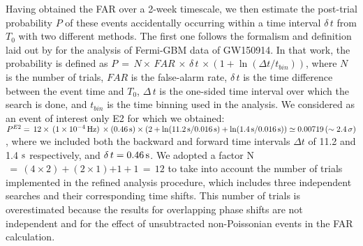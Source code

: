 \documentclass[preprint2]{aastex}
\def \fvv {}
\def \fvvv {}
\def \fvr {}
\begin{document}
Having obtained the FAR over a 2-week timescale, we then estimate the post-trial probability $P$ of these events accidentally occurring within a time interval
$\delta \, t$ from $T_0$ {\fvv with two different methods. The first one follows} the formalism and definition laid out by \cite{2016ApJ...826L...6C} for the analysis of Fermi-GBM data of GW150914.
%
{\fvv In that work, t}he probability {\fvv is defined as}
$P\,= \, N \times\, FAR \,\times\, \delta \, t \,\times (1 + \ln(\Delta t/ t_{bin}))$, where
$N$ is the number of trials,
$FAR$ is the false-alarm rate, $\delta \,t$ is the time difference between the event time and $T_0$,
$\Delta \, t$ is the one-sided time interval over which the search is done, and
$t_{bin}$ is the time binning used in the analysis.
%
%
We {\fvv considered as an event of interest only E2 for which we}
obtained:
$P^{E2} =\,1{\fvr 2} \times \, (1 \times 10^{-4} \, {\rm Hz}) \,\times
(0.46 \, {\rm s}) \times (2 + \ln(11.2 \, {\rm s}/ 0.0{\fvr 1}6 \, {\rm
s}) + \ln(1.4 \, {\rm s}/ 0.0{\fvr 1}6 \, {\rm s})) \simeq 0.00{\fvr 719}\, (\sim  2.4 \,\sigma)$,
%
%
{\fvv where we included both the backward and forward time intervals $\Delta t$ of 11.2 and 1.4 $\rm s$ respectively, and $\delta \, t = 0.46 \, \rm s$. We adopted a factor N$\,=\,(4 \times 2) + (2 \times 1){\fvr + 1 + 1}\,=\,12$ to take into account
the number of trials implemented in the refined analysis procedure, which include{\fvvv s} three independent searches
and their corresponding time shifts. {\fvvv T}his number of trials is overestimated {\fvvv because} the
results for overlapping phase shifts are not independent {\fvvv and for the effect of unsubtracted non-Poissonian events in the FAR calculation}.}
%
\end{document}
